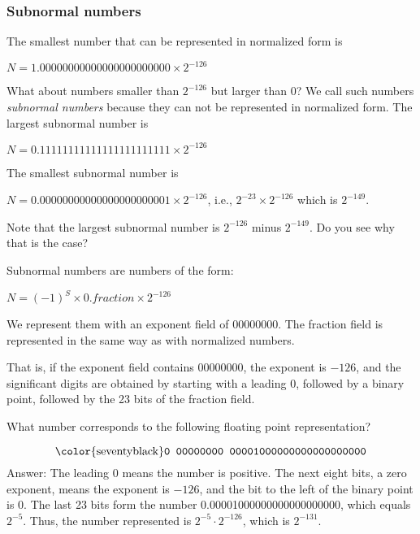 \documentclass{patt}
\begin{document}
\subsubsection{Subnormal numbers}\label{sec:subnormal}

The smallest number that can be represented in normalized form is

\vspace{.25 in}
$N = 1.00000000000000000000000 \times 2 ^{- 126}$
\vspace{.25 in}

What about numbers smaller than $2 ^{-126}$ but larger than $0$?  We call
such numbers {\em subnormal numbers} because they can not be represented in
normalized form.  The largest subnormal number is

\vspace{.25 in}
$N = 0.11111111111111111111111 \times 2 ^{- 126}$
\vspace{.25 in}

The smallest subnormal number is

\vspace{.25 in}
$N = 0.00000000000000000000001 \times 2 ^{- 126}$, i.e., $2^{-23} \times 
2^{-126}$ which is $2^{-149}$.
\vspace{.25 in}

Note that the largest subnormal number is $2^{-126}$ minus $2^{-149}$.
Do you see why that is the case?

Subnormal numbers are numbers of the form:

\vspace{.25 in}
$N = (-1)^S \times 0.fraction \times 2 ^ {- 126}$
\vspace{.25 in}

We represent them with an exponent field of 00000000.  The fraction field
is represented in the same way as with normalized numbers.

That is, if the exponent field contains 00000000, the exponent is $-126$,
and the significant digits are obtained by starting with a
leading 0, followed by a binary point, followed by the 23
bits of the fraction field.  

\begin{example}
What number corresponds to the following floating point representation?

\begin{equation*}
\text{\color{seventyblack}\texttt{0 00000000 00001000000000000000000}}
\end{equation*}
Answer: The leading 0 means the number is positive. The next eight bits, 
a zero exponent, means the exponent is $-126$, and the bit to the left of the
binary point is $0$.  The last 23 bits form the number
0.00001000000000000000000, which equals $2^{-5}$. Thus, the
number represented is \allowbreak $2^{-5}\cdot 2^{-126}$, which is $2^{-131}$.
\end{example}
\end{document}
